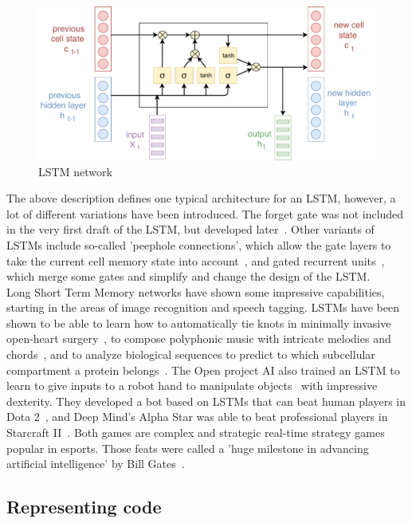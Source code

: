 \documentclass[
a4paper,
pagesize,
pdftex,
12pt,
twoside, %
BCOR=5mm, %
ngerman,
fleqn,
final,
]{scrartcl}
\begin{document}
	\begin{figure}[ht]
		\centering
		\includegraphics[width=\linewidth]{img/LSTM}
		\caption{LSTM network}
		\label{fig:architectureLSTM}
	\end{figure}
	
	The above description defines one typical architecture for an LSTM, however, a lot of different variations have been introduced. The forget gate was not included in the very first draft of the LSTM, but developed later~\cite{Gers.1999}. Other variants of LSTMs include so-called 'peephole connections', which allow the gate layers to take the current cell memory state into account~\cite{Gers.2000}, and gated recurrent units~\cite{Cho.2014}, which merge some gates and simplify and change the design of the LSTM. \\
	Long Short Term Memory networks have shown some impressive capabilities, starting in the areas of image recognition and speech tagging. LSTMs have been shown to be able to learn how to automatically tie knots in minimally invasive open-heart surgery~\cite{Mayer.2008}, to compose polyphonic music with intricate melodies and chords~\cite{Kumar.2019}, and to analyze biological sequences to predict to which subcellular compartment a protein belongs~\cite{Snderby.2015}. The Open project AI also trained an LSTM to learn to give inputs to a robot hand to manipulate objects~\cite{OpenAIBlog.2018} with impressive dexterity. They developed a bot based on LSTMs that can beat human players in Dota 2~\cite{Rodriguez.2018}, and Deep Mind's Alpha Star was able to beat professional players in Starcraft II~\cite{Stanford.2019}. Both games are complex and strategic real-time strategy games popular in esports. Those feats were called a 'huge milestone in advancing artificial intelligence' by Bill Gates~\cite{Gates2019}. 
	
	\subsection{Representing code}
	
\end{document}
